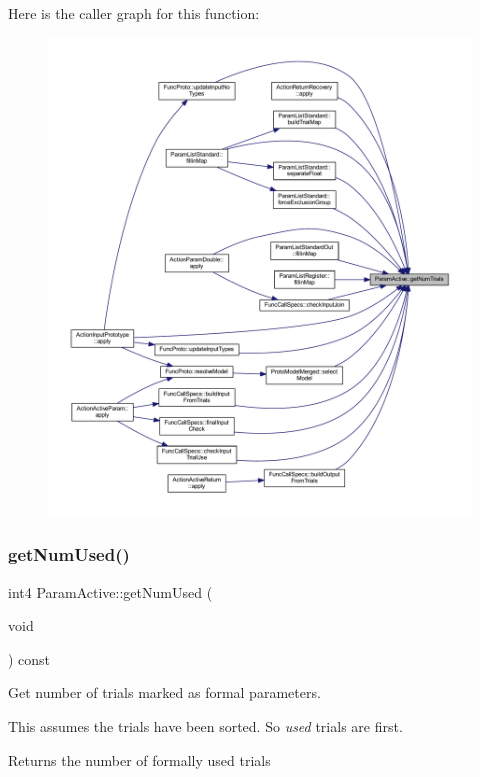 Here is the caller graph for this function\+:
\nopagebreak
\begin{figure}[H]
\begin{center}
\leavevmode
\includegraphics[width=350pt]{class_param_active_aef5c24a78fbfe7a847eceec2c8854fbb_icgraph}
\end{center}
\end{figure}
\mbox{\label{class_param_active_a9f9fb238c57992903f10a7ccc2ca45ff}} 
\subsubsection{\texorpdfstring{getNumUsed()}{getNumUsed()}}
{\footnotesize\ttfamily int4 Param\+Active\+::get\+Num\+Used (\begin{DoxyParamCaption}\item[{void}]{ }\end{DoxyParamCaption}) const}



Get number of trials marked as formal parameters. 

This assumes the trials have been sorted. So {\itshape used} trials are first. \begin{DoxyReturn}{Returns}
the number of formally used trials 
\end{DoxyReturn}



